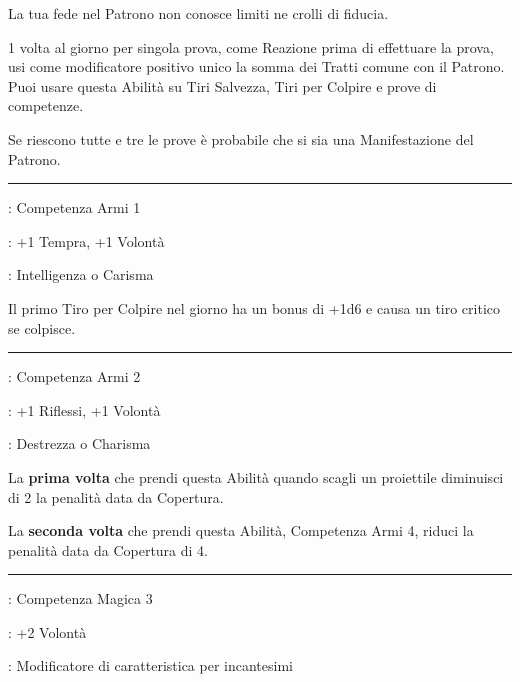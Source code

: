 \begin{multicols}{2}
La tua fede nel Patrono non conosce limiti ne crolli di fiducia.

1 volta al giorno per singola prova, come Reazione prima di effettuare la prova, usi come modificatore positivo unico la somma dei Tratti comune con il Patrono. Puoi usare questa Abilità su Tiri Salvezza, Tiri per Colpire e prove di competenze.

Se riescono tutte e tre le prove è probabile che si sia una Manifestazione del Patrono.

\smallskip\noindent\rule{\linewidth}{2pt} \hypertarget{Primo Sangue}{}\medskip{}
\noindent
\begin{description}[noitemsep, topsep=0pt, parsep=0pt, partopsep=0pt, leftmargin=0cm, labelwidth=2.5cm]
    \item[\textbf{Requisito}]: Competenza Armi 1
    \item[\textbf{Tiri Salvezza}]: +1 Tempra, +1 Volontà
    \item[\textbf{Caratteristica}]: Intelligenza o Carisma
\end{description}

Il primo Tiro per Colpire nel giorno ha un bonus di +1d6 e causa un tiro critico se colpisce.

\smallskip\noindent\rule{\linewidth}{2pt} \hypertarget{Precisino}{}\medskip{}\label{Precisino}
\noindent
\begin{description}[noitemsep, topsep=0pt, parsep=0pt, partopsep=0pt, leftmargin=0cm, labelwidth=2.5cm]
    \item[\textbf{Requisito}]: Competenza Armi 2
    \item[\textbf{Tiri Salvezza}]: +1 Riflessi, +1 Volontà
    \item[\textbf{Caratteristica}]: Destrezza o Charisma
\end{description}

La \textbf{prima volta} che prendi questa Abilità quando scagli un proiettile diminuisci di 2 la penalità data da Copertura.

La \textbf{seconda volta} che prendi questa Abilità, Competenza Armi 4, riduci la penalità data da Copertura di 4.

\smallskip\noindent\rule{\linewidth}{2pt} \hypertarget{Prodigioso}{}\medskip{}
\noindent
\begin{description}[noitemsep, topsep=0pt, parsep=0pt, partopsep=0pt, leftmargin=0cm, labelwidth=2.5cm]
    \item[\textbf{Requisito}]: Competenza Magica 3
    \item[\textbf{Tiri Salvezza}]: +2 Volontà
    \item[\textbf{Caratteristica}]: Modificatore di caratteristica per incantesimi
\end{description}


\end{multicols}

